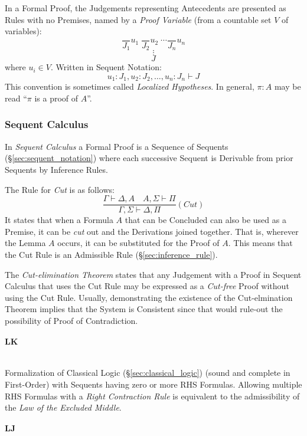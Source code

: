 In a Formal Proof, the Judgements representing Antecedents are
presented as Rules with no Premises, named by a \emph{Proof Variable}
(from a countable set $V$ of variables):
\[
    \frac{}{J_1}u_1 \; \frac{}{J_2}u_2 \; \cdots \frac{}{J_n}u_n
\]\[
    \vdots
\]\[
    J
\]
where $u_i \in V$. Written in Sequent Notation:
\[
    u_1:J_1, u_2:J_2, \ldots, u_n:J_n \vdash J
\]
This convention is sometimes called \emph{Localized Hypotheses}. In
general, $\pi : A$ may be read ``$\pi$ is a proof of $A$''.

\subsubsection{Sequent Calculus}

In \emph{Sequent Calculus} a Formal Proof is a Sequence of Sequents
(\S\ref{sec:sequent_notation}) where each successive Sequent is
Derivable from prior Sequents by Inference Rules.

The Rule for \emph{Cut} is as follows:
\[
    \frac{
        \Gamma \vdash \Delta, A \quad A, \Sigma \vdash \Pi
    }{
        \Gamma, \Sigma \vdash \Delta, \Pi
    }(Cut)
\]
It states that when a Formula $A$ that can be Concluded can also be
used as a Premise, it can be \emph{cut} out and the Derivations joined
together. That is, wherever the Lemma $A$ occurs, it can be
substituted for the Proof of $A$. This means that the Cut Rule is an
Admissible Rule (\S\ref{sec:inference_rule}).

The \emph{Cut-elimination Theorem} states that any Judgement with a
Proof in Sequent Calculus that uses the Cut Rule may be expressed as a
\emph{Cut-free} Proof without using the Cut Rule. Usually,
demonstrating the existence of the Cut-elmination Theorem implies that
the System is Consistent since that would rule-out the possibility of
Proof of Contradiction.

\paragraph{$\mathbf{LK}$} \hfill \\

Formalization of Classical Logic (\S\ref{sec:classical_logic})
(sound and complete in First-Order) with Sequents having zero or more
RHS Formulas. Allowing multiple RHS Formulas with a \emph{Right
  Contraction Rule} is equivalent to the admissibility of the
\emph{Law of the Excluded Middle}.

\paragraph{$\mathbf{LJ}$} \hfill \\

